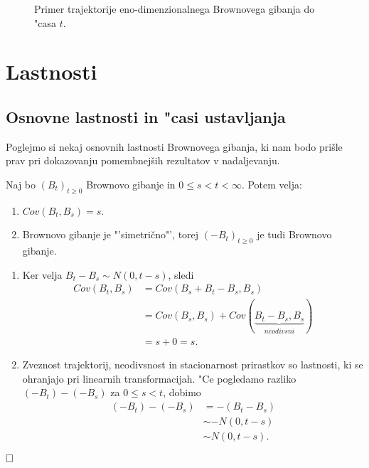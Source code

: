 \documentclass[twoside,11pt]{article}
\begin{document}
\begin{figure}[h]
    \centering
    \caption{Primer trajektorije eno-dimenzionalnega Brownovega gibanja do "casa $t$.}
    \label{fig:slika2}
\end{figure}

\section{Lastnosti}

\subsection{Osnovne lastnosti in "casi ustavljanja}

Poglejmo si nekaj osnovnih lastnosti Brownovega gibanja, ki nam bodo prišle prav pri dokazovanju pomembnejših rezultatov v nadaljevanju.

\begin{trditev}
    Naj bo $(B_t)_{t\geq 0}$ Brownovo gibanje in $0 \leq s < t < \infty$. Potem velja:
    \begin{enumerate}
        \item $ Cov(B_t, B_s) = s$.
        \item Brownovo gibanje je "'simetrično"', torej $(-B_{t})_{t\geq0}$ je tudi Brownovo gibanje.	
    \end{enumerate}
\end{trditev}

\begin{dokaz}
    \begin{enumerate}
        \item Ker velja $B_t - B_s \sim N(0, t-s)$, sledi
        \begin{align*}
            Cov(B_t, B_s) &= Cov(B_s + B_t - B_s, B_s) \\
                        &= Cov(B_s, B_s) + Cov(\underbrace{B_t - B_s, B_s}_{neodivsni}) \\
                        &= s + 0 = s.
        \end{align*}
        \item Zveznost trajektorij, neodivsnost in stacionarnost prirastkov so lastnosti, ki se ohranjajo pri linearnih transformacijah. "Ce pogledamo razliko $(-B_t) - (-B_s)$ 
        za $0 \leq s < t$, dobimo 
        \begin{align*}
        (-B_t) - (-B_s) &= -(B_t - B_s)\\
                        &\sim -N(0, t - s)\\
                        &\sim N(0, t-s).
        \end{align*}
    \end{enumerate}
    $\hfill \square$
\end{dokaz}
\end{document}

